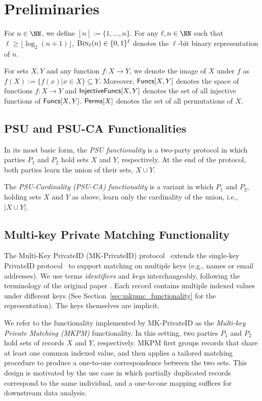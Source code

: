 \section{Preliminaries}
 For $n \in \NN$, we define $[n] := \{1, \dots, n\}$.  For
any $\ell, n\in \NN$ such that $\ell \geq \lfloor \log_2 (n+1)\rfloor$,
$\textsc{Bin}_{\ell}(n) \in \{0,1\}^\ell$ denotes the $\ell$-bit binary representation of
$n$.

For sets $X,Y$ and any function $f:X\to Y$, we denote the image of $X$ under $f$
as $f(X) := \{f(x) | x \in X\} \subseteq Y$.  Moreover, $\mathsf{Funcs}[X, Y]$ denotes
the space of functions $f: X \to Y$ and $\mathsf{InjectiveFuncs}[X, Y]$ denotes the set of all
injective functions of $\mathsf{Funcs}[X, Y]$. $\mathsf{Perms}[X]$ denotes the set of all
permutations of $X$.

\subsection{PSU and PSU-CA Functionalities}

In its most basic form, the \emph{PSU functionality} is a two-party protocol in which parties $P_1$ and $P_2$ hold sets $X$ and $Y$, respectively. At the end of the protocol, both parties learn the union of their sets, $X \cup Y$.

The \emph{PSU-Cardinality (PSU-CA) functionality} is a variant in which $P_1$ and $P_2$, holding sets $X$ and $Y$ as above, learn only the cardinality of the union, i.e., $|X \cup Y|$.

\subsection{Multi-key Private Matching Functionality}
\label{sec:MKPM-functionality}
 The Multi-Key PrivateID (MK-PrivateID)
protocol~\cite{MKPMC} extends the single-key PrivateID protocol~\cite{PMC} to
support matching on multiple keys (e.g., names or email addresses). We use terms
\emph{identifiers} and \emph{keys} interchangeably, following the terminology of
the original paper \cite{MKPMC}. Each record contains multiple indexed values
under different keys (See Section~\ref{sec:mkpmc_functionality} for the
representation). The keys themselves are implicit.

 We refer to the functionality implemented by
MK-PrivateID as the \emph{Multi-key Private Matching (MKPM)} functionality. In
this setting, two parties $P_1$ and $P_2$ hold sets of records $X$ and $Y$,
respectively. MKPM first groups records that share at least one common indexed
value, and then applies a tailored matching procedure to produce a one-to-one
correspondence between the two sets. This design is motivated by the use case in
which partially duplicated records correspond to the same individual, and a
one-to-one mapping suffices for downstream data analysis.

